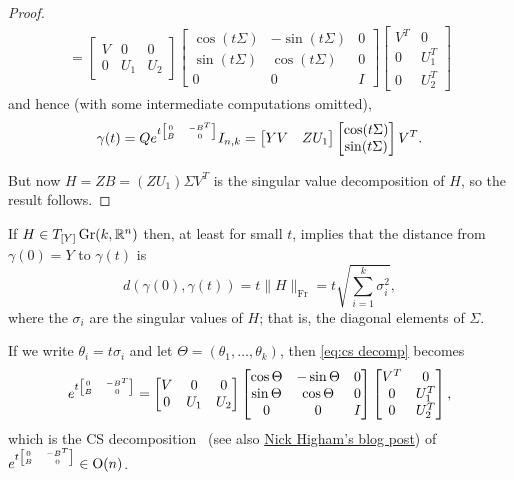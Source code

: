 \begin{proof}
\begin{multline}
		= \begin{bmatrix} V & 0 & 0 \\ 0 & U_1 & U_2 \end{bmatrix} \begin{bmatrix} \cos(t \Sigma) & - \sin(t\Sigma) & 0 \\ \sin(t\Sigma) & \cos(t\Sigma) & 0 \\ 0 & 0 & I \end{bmatrix} \begin{bmatrix} V^T & 0 \\ 0 & U_1^T \\ 0 & U_2^T \end{bmatrix}
	\end{multline}
	and hence (with some intermediate computations omitted),
	\[
		\gamma(t) =  Qe^{t{\tiny\begin{bmatrix} 0 & -B^T \\ B & 0 \end{bmatrix}}} I_{n,k} = \begin{bmatrix} YV & ZU_1 \end{bmatrix} \begin{bmatrix} \cos(t\Sigma) \\ \sin(t\Sigma) \end{bmatrix} V^T.
	\]
	
	But now $H = ZB = (ZU_1)\Sigma V^T$ is the singular value decomposition of $H$, so the result follows.
\end{proof}

If $H \in T_{[Y]}\operatorname{Gr}(k,\mathbb{R}^n)$ then, at least for small $t$,  implies that the distance from $\gamma(0) = Y$ to $\gamma(t)$ is
\[
	d(\gamma(0),\gamma(t)) = t\|H\|_{\text{Fr}} = t \sqrt{\sum_{i=1}^k \sigma_i^2},
\]
where the $\sigma_i$ are the singular values of $H$; that is, the diagonal elements of $\Sigma$. 

If we write $\theta_i = t \sigma_i$ and let $\Theta = (\theta_1, \dots , \theta_k)$, then \eqref{eq:cs decomp} becomes
\[
	e^{t {\tiny\begin{bmatrix} 0 & -B^T \\ B & 0 \end{bmatrix}}} = \begin{bmatrix} V & 0 & 0 \\ 0 & U_1 & U_2 \end{bmatrix} \begin{bmatrix} \cos\Theta & - \sin\Theta & 0 \\ \sin\Theta & \cos\Theta & 0 \\ 0 & 0 & I \end{bmatrix} \begin{bmatrix} V^T & 0 \\ 0 & U_1^T \\ 0 & U_2^T \end{bmatrix},
\]
which is the CS decomposition~\cite{golubMatrixComputations2013,paigeHistoryGeneralityCS1994} (see also \href{https://nhigham.com/2020/10/27/what-is-the-cs-decomposition/}{Nick Higham's blog post}) of $e^{t {\tiny\begin{bmatrix} 0 & -B^T \\ B & 0 \end{bmatrix}}} \in \operatorname{O}(n)$.

